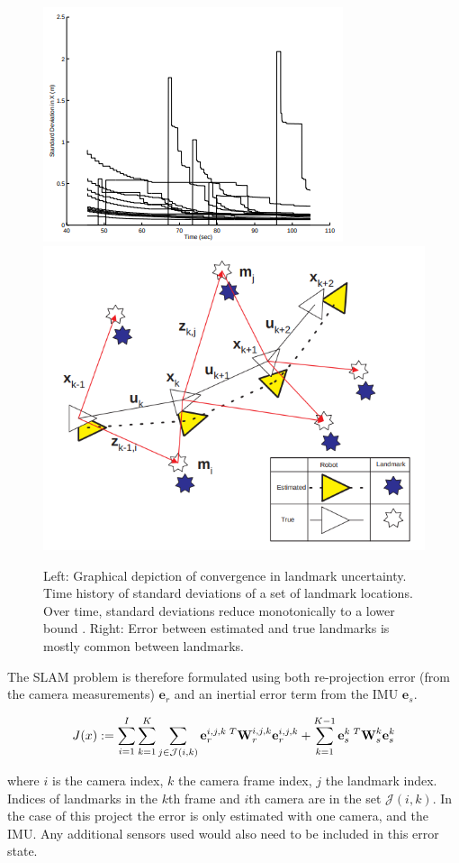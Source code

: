 \documentclass[a4paper,11pt,notitlepage]{article}
\begin{document}
\noindent \begin{figure}[h!]
\includegraphics[width = 0.5\hsize]{figures/convergence_landmark_uncertainty.png}
\includegraphics[width = 0.5\hsize]{figures/ess_slam.png}
\caption{Left: Graphical depiction of convergence in landmark uncertainty. Time history of standard deviations of a set of landmark locations. Over time, standard deviations reduce monotonically to a lower bound \cite{F_Durr_Pt1}. Right: Error between estimated and true landmarks is mostly common between landmarks.}
\label{slam_prob_fig}
\end{figure}

The SLAM problem is therefore formulated using both re-projection error (from the camera measurements) $\textbf{e}_{r}$ and an inertial error term from the IMU $\textbf{e}_{s}$.  

\begin{equation}
\begin{aligned}
J(x) := \sum_{i=1}^{I} \sum_{k=1}^{K}\sum_{j \in \mathcal{J}(i,k)} \textbf{e}_{r}^{i,j,k \textnormal{ } T} \textbf{W}_{r}^{i,j,k} \textbf{e}_{r}^{i,j,k} + 
\sum_{k=1}^{K-1} \textbf{e}_{s}^{k \textnormal{ } T} \textbf{W}_{s}^{k} \textbf{e}_{s}^{k} 
\end{aligned}
\end{equation}

where $i$ is the camera index, $k$ the camera frame index, $j$ the landmark index. Indices of landmarks in the $k$th frame and $i$th camera are in the set $\mathcal{J}(i,k)$. In the case of this project the error is only estimated with one camera, and the IMU. Any additional sensors used would also need to be included in this error state. 
\end{document}
